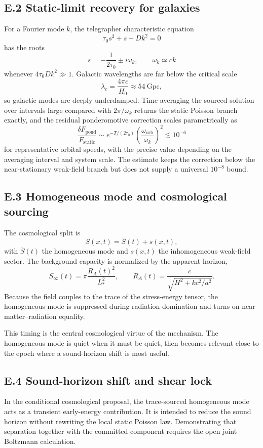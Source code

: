 \documentclass[11pt]{article}
\begin{document}
\subsection*{E.2 Static-limit recovery for galaxies}

For a Fourier mode $k$, the telegrapher characteristic equation
\[
\tau_0 s^2+s+Dk^2=0
\]
has the roots
\[
s=-\frac{1}{2\tau_0}\pm i\omega_k,
\qquad
\omega_k\simeq ck
\]
whenever $4\tau_0Dk^2\gg 1$. Galactic wavelengths are far below the critical scale
\[
\lambda_c=\frac{4\pi c}{H_0}\approx 54\ \mathrm{Gpc},
\]
so galactic modes are deeply underdamped. Time-averaging the sourced solution over intervals large compared with $2\pi/\omega_k$ returns the static Poisson branch exactly, and the residual ponderomotive correction scales parametrically as
\[
\frac{\delta F_{\mathrm{pond}}}{F_{\mathrm{static}}}
\sim
e^{-T/(2\tau_0)}
\left(\frac{\omega_{\mathrm{orb}}}{\omega_k}\right)^2
\lesssim 10^{-6}
\]
for representative orbital speeds, with the precise value depending on the averaging interval and system scale. The estimate keeps the correction below the near-stationary weak-field branch but does not supply a universal $10^{-8}$ bound.

\subsection*{E.3 Homogeneous mode and cosmological sourcing}

The cosmological split is
\[
S(x,t)=\overline S(t)+s(x,t),
\]
with $\overline S(t)$ the homogeneous mode and $s(x,t)$ the inhomogeneous weak-field sector. The background capacity is normalized by the apparent horizon,
\[
S_\infty(t)=\pi\frac{R_A(t)^2}{L_*^2},
\qquad
R_A(t)=\frac{c}{\sqrt{H^2+k c^2/a^2}}.
\]
Because the field couples to the trace of the stress-energy tensor, the homogeneous mode is suppressed during radiation domination and turns on near matter--radiation equality.

This timing is the central cosmological virtue of the mechanism. The homogeneous mode is quiet when it must be quiet, then becomes relevant close to the epoch where a sound-horizon shift is most useful.

\subsection*{E.4 Sound-horizon shift and shear lock}

In the conditional cosmological proposal, the trace-sourced homogeneous mode acts as a transient early-energy contribution. It is intended to reduce the sound horizon without rewriting the local static Poisson law. Demonstrating that separation together with the committed component requires the open joint Boltzmann calculation.
\end{document}
